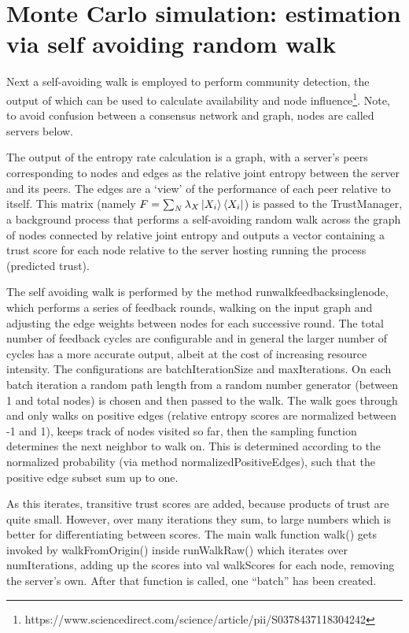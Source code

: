\documentclass{article}
\begin{document}
\section{Monte Carlo simulation: estimation via self avoiding random walk}
Next a self-avoiding walk is employed to perform community detection, the output of which can be used to calculate availability and node influence\footnote{https://www.sciencedirect.com/science/article/pii/S0378437118304242}. Note, to avoid confusion between a consensus network and graph, nodes are called servers below.

The output of the entropy rate calculation is a graph, with a server’s peers corresponding to nodes and edges as the relative joint entropy between the server and its peers. The edges are a ‘view’ of the performance of each peer relative to itself. This matrix (namely $F = \sum_N \lambda_X \ket{X_i} \bra{X_i}$) is passed to the TrustManager, a background process that performs a self-avoiding random walk across the graph of nodes connected by relative joint entropy and outputs a vector containing a trust score for each node relative to the server hosting running the process (predicted trust).

The self avoiding walk is performed by the method runwalkfeedbacksinglenode, which performs a series of feedback rounds, walking on the input graph and adjusting the edge weights between nodes for each successive round. The total number of feedback cycles are configurable and in general the larger number of cycles has a more accurate output, albeit at the cost of increasing resource intensity. The configurations are batchIterationSize and maxIterations. On each batch iteration a random path length from a random number generator (between 1 and total nodes) is chosen and then passed to the walk. The walk goes through and only walks on positive edges (relative entropy scores are normalized between -1 and 1), keeps track of nodes visited so far, then the sampling function determines the next neighbor to walk on. This is determined according to the normalized probability (via method normalizedPositiveEdges), such that the positive edge subset sum up to one.

As this iterates, transitive trust scores are added, because products of trust are quite small. However, over many iterations they sum, to large numbers which is better for differentiating between scores. The main walk function walk() gets invoked by walkFromOrigin() inside runWalkRaw() which iterates over numIterations, adding up the scores into val walkScores for each node, removing the server’s own. After that function is called, one “batch” has been created. 
\end{document}
